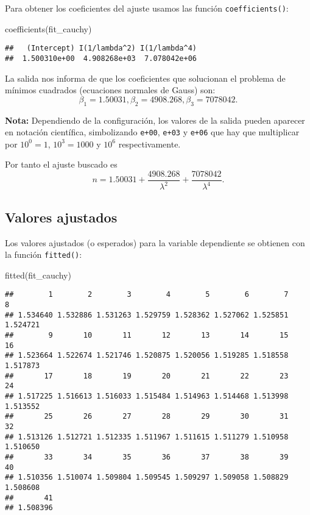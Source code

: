 \documentclass[
  degree=mecinf,
  title=normal,
  toc=normal,
  bib=normal]{mnye}
\newenvironment{Shaded}{\begin{snugshade}}{\end{snugshade}}
\newcommand{\FunctionTok}[1]{\textcolor[rgb]{0.00,0.00,0.00}{#1}}
\newcommand{\NormalTok}[1]{#1}
\begin{document}
Para obtener los coeficientes del ajuste usamos las función \texttt{coefficients()}:

\begin{Shaded}
\begin{Highlighting}[]
\FunctionTok{coefficients}\NormalTok{(fit\_cauchy) }
\end{Highlighting}
\end{Shaded}

\begin{verbatim}
##   (Intercept) I(1/lambda^2) I(1/lambda^4) 
##  1.500310e+00  4.908268e+03  7.078042e+06
\end{verbatim}

La salida nos informa de que los coeficientes que solucionan el problema de mínimos cuadrados (ecuaciones normales de Gauss) son:
\[\beta_1 = 1.50031, \beta_2 = 4908.268, \beta_3=7078042.\]

\textbf{Nota:} Dependiendo de la configuración, los valores de la salida pueden aparecer en notación científica, simbolizando \texttt{e+00}, \texttt{e+03} y \texttt{e+06} que hay que multiplicar por \(10^0=1\), \(10^3=1000\) y \(10^6\) respectivamente.

Por tanto el ajuste buscado es
\[n = 1.50031 + \frac{4908.268}{\lambda^2} + \frac{7078042}{\lambda^4}.\]

\hypertarget{valores-ajustados}{%
\subsection{Valores ajustados}\label{valores-ajustados}}

Los valores ajustados (o esperados) para la variable dependiente se obtienen con la función \texttt{fitted()}:

\begin{Shaded}
\begin{Highlighting}[]
\FunctionTok{fitted}\NormalTok{(fit\_cauchy)}
\end{Highlighting}
\end{Shaded}

\begin{verbatim}
##        1        2        3        4        5        6        7        8 
## 1.534640 1.532886 1.531263 1.529759 1.528362 1.527062 1.525851 1.524721 
##        9       10       11       12       13       14       15       16 
## 1.523664 1.522674 1.521746 1.520875 1.520056 1.519285 1.518558 1.517873 
##       17       18       19       20       21       22       23       24 
## 1.517225 1.516613 1.516033 1.515484 1.514963 1.514468 1.513998 1.513552 
##       25       26       27       28       29       30       31       32 
## 1.513126 1.512721 1.512335 1.511967 1.511615 1.511279 1.510958 1.510650 
##       33       34       35       36       37       38       39       40 
## 1.510356 1.510074 1.509804 1.509545 1.509297 1.509058 1.508829 1.508608 
##       41 
## 1.508396
\end{verbatim}
\end{document}
